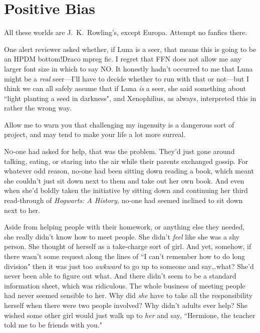 \chapter{Positive Bias}

\begin{chapterOpeningAuthorNote}
All these worlds are J.~K.~Rowling's, except Europa. Attempt no fanfics there.

One alert reviewer asked whether, if Luna is a seer, that means this is going to be an HPDM bottom!Draco mpreg fic. I regret that FFN does not allow me any larger font size in which to say NO. It honestly hadn't occurred to me that Luna might be a \emph{real} seer—I'll have to decide whether to run with that or not—but I think we can all safely assume that if Luna \emph{is} a seer, she said something about ``light planting a seed in darkness", and Xenophilius, as always, interpreted this in rather the wrong way.
\end{chapterOpeningAuthorNote}
\begin{chapterOpeningQuote}
Allow me to warn you that challenging my ingenuity is a dangerous sort of project, and may tend to make your life a lot more surreal.
\end{chapterOpeningQuote}

\lettrine{N}{o}-one had asked for help, that was the problem. They'd just gone around talking, eating, or staring into the air while their parents exchanged gossip. For whatever odd reason, no-one had been sitting down reading a book, which meant she couldn't just sit down next to them and take out her own book. And even when she'd boldly taken the initiative by sitting down and continuing her third read-through of \emph{Hogwarts: A History,} no-one had seemed inclined to sit down next to her.

Aside from helping people with their homework, or anything else they needed, she really didn't know how to meet people. She didn't \emph{feel} like she was a shy person. She thought of herself as a take-charge sort of girl. And yet, somehow, if there wasn't some request along the lines of ``I can't remember how to do long division" then it was just too \emph{awkward} to go up to someone and say…what? She'd never been able to figure out what. And there didn't seem to be a standard information sheet, which was ridiculous. The whole business of meeting people had never seemed sensible to her. Why did \emph{she} have to take all the responsibility herself when there were two people involved? Why didn't adults ever help? She wished some other girl would just walk up to \emph{her} and say, ``Hermione, the teacher told me to be friends with you."

